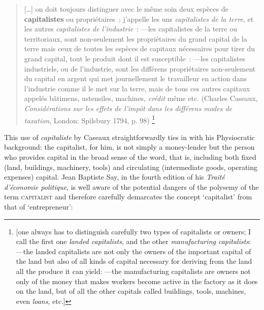 \documentclass[output=paper]{langsci/langscibook}
\begin{document}
\begin{quote}
{[}\ldots{}{]} on doit toujours distinguer avec le même soin deux
espèces de \textbf{capitalistes} ou propriétaires~; j'appelle les uns
\emph{capitalistes de la terre}, et les autres \emph{capitalistes de
l'industrie}~: ---les capitalistes de la terre ou territoriaux, sont
non-seulement les propriétaires du grand capital de la terre mais ceux
de toutes les espèces de capitaux nécessaires pour tirer du grand
capital, tout le produit dont il est susceptible~: ---les capitalistes
industriels, ou de l'industrie, sont les différens propriétaires
non-seulement du capital en argent qui met journellement le travailleur
en action dans l'industrie comme il le met sur la terre, mais de tous
ces autres capitaux appelés bâtimens, ustensiles, machines,
\emph{crédit} même etc.
  (Charles Caseaux, \emph{Considérations sur les effets de l'impôt dans les
différens modes de taxation}, London: Spilsbury 1794, p. 98)%
\footnote{{[}one always has to distinguish
  carefully two types of capitalists or owners; I call the first one
  \emph{landed capitalists}, and the other \emph{manufacturing
  capitalists}: ---the landed capitalists are not only the owners of the
  important capital of the land but also of all kinds of capital
  necessary for deriving from the land all the produce it can yield:
  ---the manufacturing capitalists are owners not only of the money that
  makes workers become active in the factory as it does on the land, but
  of all the other capitals called buildings, tools, machines, even
  \emph{loans}, etc.{]}}
\end{quote}


This use of \emph{capitaliste} by Caseaux straightforwardly ties in with
his Physiocratic background: the capitalist, for him, is not simply a
money-lender but the person who provides capital in the broad sense of
the word, that is, including both fixed (land, buildings, machinery,
tools) and circulating (intermediate goods, operating expenses) capital.
Jean Baptiste Say, in the fourth edition of his \emph{Traité d'économie
politique}, is well aware
of the potential dangers of the polysemy of the term \textsc{capitalist}
and therefore carefully demarcates the concept `capitalist' from that of
`entrepreneur':
\end{document}
